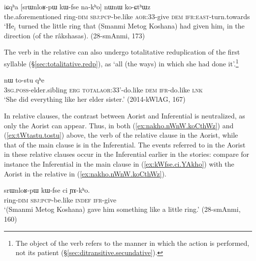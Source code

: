 \begin{exe}
\ex \label{ex:nakho.nWnW.koCthWz}
\gll iɕqʰa [srɯnloʁ-pɯ kɯ-fse na-kʰo] nɯnɯ ko-ɕtʰɯz \\
the.aforementioned ring-\textsc{dim} \textsc{sbj}:\textsc{pcp}-be.like \textsc{aor}:3\fl{}3-give \textsc{dem} \textsc{ifr}:\textsc{east}-turn.towards \\
\glt `He$_i$ turned the little ring that (Smanmi Metog Koshana) had given him$_i$ in the direction (of the râkshasas). (28-smAnmi, 173)
\end{exe}

The verb in the relative can also undergo totalitative reduplication of the first syllable (§\ref{sec:totalitative.redp}), as  `all (the ways) in which she had done it'.\footnote{The object of the verb  refers to the manner in which the action is performed, not its patient (§\ref{sec:ditransitive.secundative}). }

\begin{exe}
\ex \label{ex:tWtastu.tostu}
 nɯ to-stu qʰe \\
\textsc{3sg}.\textsc{poss}-elder.sibling \textsc{erg} \textsc{total}\redp{}\textsc{aor}:3\fl{}3'-do.like \textsc{dem} \textsc{ifr}-do.like \textsc{lnk} \\
\glt `She did everything like her elder sister.' (2014-kWlAG, 167)
\end{exe}

In relative clauses, the contrast between Aorist and Inferential is neutralized, as only the Aorist can appear. Thus, in both (\ref{ex:nakho.nWnW.koCthWz}) and (\ref{ex:tWtastu.tostu}) above, the verb of the relative clause in the Aorist, while that of the main clause is in the Inferential. The events referred to in the Aorist in these relative clauses occur in the Inferential earlier in the stories: compare for instance the Inferential  in the main clause in (\ref{ex:kWfse.ci.YAkho}) with the Aorist  in the relative in (\ref{ex:nakho.nWnW.koCthWz}).

\begin{exe}
\ex \label{ex:kWfse.ci.YAkho}
\gll srɯnloʁ-pɯ kɯ-fse ci ɲɤ-kʰo. \\
 ring-\textsc{dim} \textsc{sbj}:\textsc{pcp}-be.like \textsc{indef} \textsc{ifr}-give \\
 \glt `(Smanmi Metog Koshana) gave him something like a little ring.' (28-smAnmi, 160)
\end{exe}

